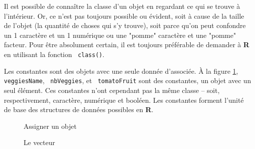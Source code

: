 \documentclass[10.5pt,a4paper]{article}
\newcommand{\rcode}[1]{\texttt{\color{rstudio} #1}}
\begin{document}
    Il est possible de connaître la classe d'un objet en regardant ce qui se trouve à l'intérieur. Or, ce n'est pas toujours possible ou évident, soit à cause de la taille de l'objet (la quantité de choses qui s'y trouve), soit parce qu'on peut confondre un 1 caractère et un 1 numérique ou une "pomme" caractère et une "pomme" facteur. Pour être absolument certain, il est toujours préférable de demander à \textbf{R} en utilisant la fonction \rcode{class()}.
    
    Les constantes sont des objets avec une seule donnée d'associée. À la figure \ref{struObj}, \rcode{veggiesName}, \rcode{nbVeggies}, et \rcode{tomatoFruit} sont des constantes, un objet avec un seul élément. Ces constantes n'ont cependant pas la même classe -- soit, respectivement, caractère, numérique et booléen. Les constantes forment l'unité de base des structures de données possibles en \textbf{R}.
    
    \begin{figure}[H]
    \centering
    \caption{Assigner un objet}
    \label{struObj}
    \end{figure}
    
    \begin{figure}[H]
    \centering
    \caption{Le vecteur}
    \label{struVec1}
    \end{figure}
    
\end{document}
